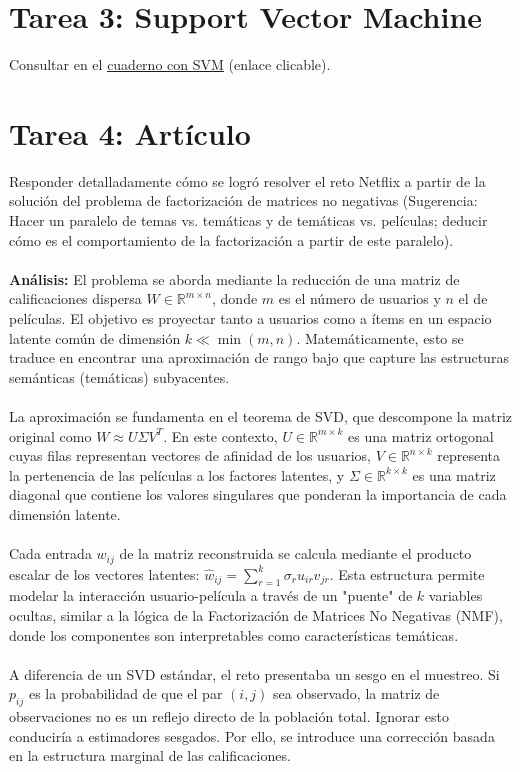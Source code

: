 \documentclass{article}
\begin{document}
\section{Tarea 3: Support Vector Machine}
Consultar en el \href{https://colab.research.google.com/drive/1PkO9KV9lTNLd1QfVFIFTe7x3J4I-Q_pE?usp=sharing}{cuaderno con SVM} (enlace clicable).
\section{Tarea 4: Artículo}
\noindent Responder detalladamente cómo se logró resolver el reto Netflix a partir de la solución del problema de factorización de matrices no negativas (Sugerencia: Hacer un paralelo de temas vs. temáticas y de temáticas vs. películas; deducir cómo es el comportamiento de la factorización a partir de este paralelo). \\ \\
\textbf{Análisis:}
El problema se aborda mediante la reducción de una matriz de calificaciones dispersa $W \in \mathbb{R}^{m \times n}$, donde $m$ es el número de usuarios y $n$ el de películas. El objetivo es proyectar tanto a usuarios como a ítems en un espacio latente común de dimensión $k \ll \min(m, n)$. Matemáticamente, esto se traduce en encontrar una aproximación de rango bajo que capture las estructuras semánticas (temáticas) subyacentes. \\ \\
La aproximación se fundamenta en el teorema de SVD, que descompone la matriz original como $W \approx U \Sigma V^{T}$. En este contexto, $U \in \mathbb{R}^{m \times k}$ es una matriz ortogonal cuyas filas representan vectores de afinidad de los usuarios, $V \in \mathbb{R}^{n \times k}$ representa la pertenencia de las películas a los factores latentes, y $\Sigma \in \mathbb{R}^{k \times k}$ es una matriz diagonal que contiene los valores singulares que ponderan la importancia de cada dimensión latente. \\ \\
Cada entrada $w_{ij}$ de la matriz reconstruida se calcula mediante el producto escalar de los vectores latentes: $\hat{w}_{ij} = \sum_{r=1}^{k} \sigma_r u_{ir} v_{jr}$. Esta estructura permite modelar la interacción usuario-película a través de un "puente" de $k$ variables ocultas, similar a la lógica de la Factorización de Matrices No Negativas (NMF), donde los componentes son interpretables como características temáticas. \\ \\
A diferencia de un SVD estándar, el reto presentaba un sesgo en el muestreo. Si $p_{ij}$ es la probabilidad de que el par $(i, j)$ sea observado, la matriz de observaciones no es un reflejo directo de la población total. Ignorar esto conduciría a estimadores sesgados. Por ello, se introduce una corrección basada en la estructura marginal de las calificaciones. \\ \\
\end{document}
